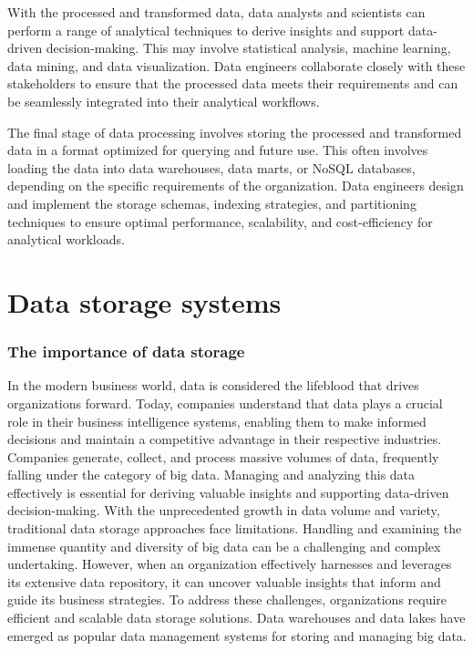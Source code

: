 With the processed and transformed data, data analysts and scientists can perform a range of analytical techniques to derive insights and support data-driven decision-making. This may involve statistical analysis, machine learning, data mining, and data visualization. Data engineers collaborate closely with these stakeholders to ensure that the processed data meets their requirements and can be seamlessly integrated into their analytical workflows\footnotemark[10].

The final stage of data processing involves storing the processed and transformed data in a format optimized for querying and future use. This often involves loading the data into data warehouses, data marts, or NoSQL databases, depending on the specific requirements of the organization. Data engineers design and implement the storage schemas, indexing strategies, and partitioning techniques to ensure optimal performance, scalability, and cost-efficiency for analytical workloads\footnotemark[10].

\section{Data storage systems}

\subsubsection{The importance of data storage}

In the modern business world, data is considered the lifeblood that drives organizations forward. Today, companies understand that data plays a crucial role in their business intelligence systems, enabling them to make informed decisions and maintain a competitive advantage in their respective industries\footnotemark[20]. Companies generate, collect, and process massive volumes of data, frequently falling under the category of big data. Managing and analyzing this data effectively is essential for deriving valuable insights and supporting data-driven decision-making\footnotemark[20]. With the unprecedented growth in data volume and variety, traditional data storage approaches face limitations. Handling and examining the immense quantity and diversity of big data can be a challenging and complex undertaking. However, when an organization effectively harnesses and leverages its extensive data repository, it can uncover valuable insights that inform and guide its business strategies\footnotemark[20]. To address these challenges, organizations require efficient and scalable data storage solutions. Data warehouses and data lakes have emerged as popular data management systems for storing and managing big data\footnotemark[20].

